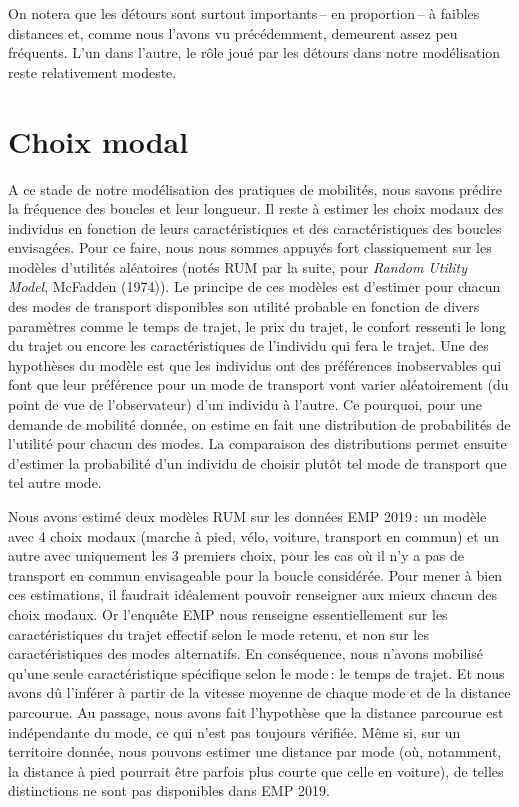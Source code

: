 \documentclass[
  9pt,
  a4paper,
  DIV=11]{scrreprt}
\begin{document}
On notera que les détours sont surtout importants\,-- en proportion\,--
à faibles distances et, comme nous l'avons vu précédemment, demeurent
assez peu fréquents. L'un dans l'autre, le rôle joué par les détours
dans notre modélisation reste relativement modeste.

\section{Choix modal}\label{choix-modal}

A ce stade de notre modélisation des pratiques de mobilités, nous savons
prédire la fréquence des boucles et leur longueur. Il reste à estimer
les choix modaux des individus en fonction de leurs caractéristiques et
des caractéristiques des boucles envisagées. Pour ce faire, nous nous
sommes appuyés fort classiquement sur les modèles d'utilités aléatoires
(notés RUM par la suite, pour \emph{Random Utility Model}, McFadden
(1974)). Le principe de ces modèles est d'estimer pour chacun des modes
de transport disponibles son utilité probable en fonction de divers
paramètres comme le temps de trajet, le prix du trajet, le confort
ressenti le long du trajet ou encore les caractéristiques de l'individu
qui fera le trajet. Une des hypothèses du modèle est que les individus
ont des préférences inobservables qui font que leur préférence pour un
mode de transport vont varier aléatoirement (du point de vue de
l'observateur) d'un individu à l'autre. Ce pourquoi, pour une demande de
mobilité donnée, on estime en fait une distribution de probabilités de
l'utilité pour chacun des modes. La comparaison des distributions permet
ensuite d'estimer la probabilité d'un individu de choisir plutôt tel
mode de transport que tel autre mode.

Nous avons estimé deux modèles RUM sur les données EMP 2019\,: un modèle
avec 4 choix modaux (marche à pied, vélo, voiture, transport en commun)
et un autre avec uniquement les 3 premiers choix, pour les cas où il n'y
a pas de transport en commun envisageable pour la boucle considérée.
Pour mener à bien ces estimations, il faudrait idéalement pouvoir
renseigner aux mieux chacun des choix modaux. Or l'enquête EMP nous
renseigne essentiellement sur les caractéristiques du trajet effectif
selon le mode retenu, et non sur les caractéristiques des modes
alternatifs. En conséquence, nous n'avons mobilisé qu'une seule
caractéristique spécifique selon le mode\,: le temps de trajet. Et nous
avons dû l'inférer à partir de la vitesse moyenne de chaque mode et de
la distance parcourue. Au passage, nous avons fait l'hypothèse que la
distance parcourue est indépendante du mode, ce qui n'est pas toujours
vérifiée. Même si, sur un territoire donnée, nous pouvons estimer une
distance par mode (où, notamment, la distance à pied pourrait être
parfois plus courte que celle en voiture), de telles distinctions ne
sont pas disponibles dans EMP 2019.
\end{document}
